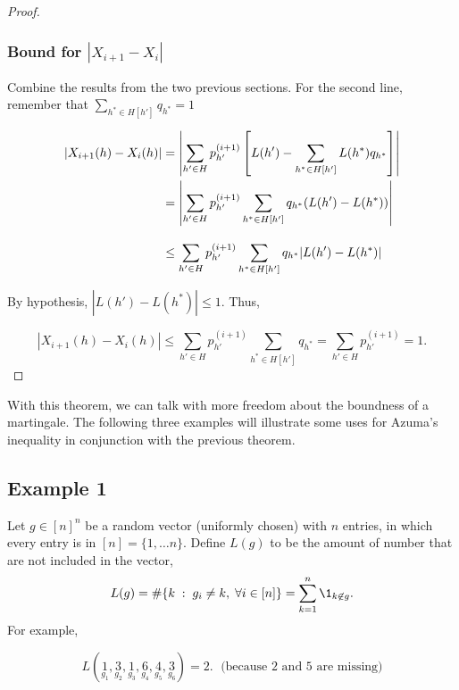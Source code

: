 \begin{proof}
\subsubsection*{Bound for $|X_{i+1}- X_i|$}
Combine the results from the two previous sections. For the second line, remember that $\sum_{h^*\in H[h']} q_{h^*} = 1$
\[ \everymath{\displaystyle}\arraycolsep=1.4pt\def\arraystretch{2.9} 
\begin{array}{rcl}
    |X_{i+1}(h)- X_i(h)| & = & \left|\sum_{h' \in H}p_{h'}^{(i+1)} \left[ L(h') - \sum_{h^* \in H[h']}  L(h^*)q_{h^*}\right] \right|\\
    & = & \left|\sum_{h' \in H}p_{h'}^{(i+1)} \sum_{h^* \in H[h']} q_{h^*}(L(h') - L(h^*)) \right|\\
    & \leq & \sum_{h' \in H}p_{h'}^{(i+1)} \sum_{h^* \in H[h']} q_{h^*} |L(h') - L(h^*)|
\end{array} \] 

By hypothesis, $|L(h') - L(h^*)| \leq 1$. Thus,

\[|X_{i+1}(h)- X_i(h)| \leq  \sum_{h' \in H}p_{h'}^{(i+1)} \sum_{h^* \in H[h']} q_{h^*} = \sum_{h' \in H}p_{h'}^{(i+1)} = 1. \] 

\end{proof}

With this theorem, we can talk with more freedom about the boundness of a martingale. The following three examples will illustrate some uses for Azuma's inequality in conjunction with the previous theorem.

\subsection*{Example 1}
Let $g \in {[n]}^{n}$ be a random vector (uniformly chosen) with $n$ entries, in which every entry is in $[n] = \{1,\ldots n\}$. Define $L(g)$ to be the amount of number that are not included in the vector,
\[ L(g) = \# \{ k \;:\; g_i \neq k,\; \forall i \in [n]\} = \sum_{k = 1}^{n} \1_{k \not\in g}. \] 
For example,

\[ L(\underset{g_1}{1},\underset{g_2}{3},\underset{g_3}{1},\underset{g_4}{6},\underset{g_5}{4},\underset{g_6}{3}) = 2.\;\text{ (because 2 and 5 are missing)} \]

